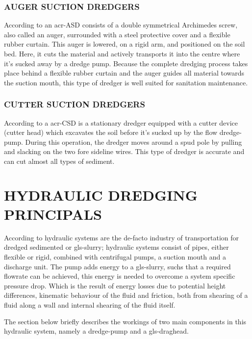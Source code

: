 \subsubsection{AUGER SUCTION DREDGERS}
According to \citet{vbko_vereniging_van_waterbouwers_in_bagger_kust_en_oeverwerken_voortgezette_1998} an
\gls{acr-ASD} consists of a double symmetrical Archimedes screw, also called an auger, surrounded with a steel
protective cover and a flexible rubber curtain. This auger is lowered, on a rigid arm, and positioned on the soil bed.
Here, it cuts the material and actively transports it into the centre where it's sucked away by a dredge pump. Because
the complete dredging process takes place behind a flexible rubber curtain and the auger guides all material towards the
suction mouth, this type of dredger is well suited for sanitation maintenance.

\subsubsection{CUTTER SUCTION DREDGERS}
According to \citet{vlasblom_designing_nodate} a \gls{acr-CSD} is a stationary dredger equipped with a cutter
device (cutter head)  which excavates the soil before it's sucked up by the flow dredge-pump. During this operation, the
dredger moves around a spud pole by pulling and slacking on the two fore sideline wires. This type of dredger is
accurate and can cut almost all types of sediment.

\section{HYDRAULIC DREDGING PRINCIPALS}
According to \citet{van_den_berg_ihc_2013} hydraulic systems are the de-facto industry of transportation for dredged
sedimented or \gls{gls-slurry}; hydraulic systems consist of pipes, either flexible or rigid, combined with centrifugal
pumps, a suction mouth and a discharge unit. The pump adds energy to a \gls{gls-slurry}, suchs that a required flowrate
can be achieved, this energy is needed to overcome a system specific pressure drop. Which is the result of energy losses
due to potential height differences, kinematic  behaviour of the fluid and friction, both from shearing of a fluid along
a wall and internal shearing of the fluid itself.

The section below briefly describes the workings of two main components in this hydraulic system, namely a dredge-pump
and a \gls{gls-draghead}.

